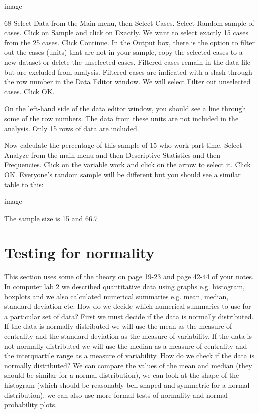 image
 
68%
Select Data from the Main menu, then Select Cases. Select Random sample of cases. Click on Sample and click on Exactly. We want to select exactly 15 cases from the 25 cases. Click Continue. In the Output box, there is the option to filter out the cases (units) that are not in your sample, copy the selected cases to a new dataset or delete the unselected cases. Filtered cases remain in the data file but are excluded from analysis. Filtered cases are indicated with a slash through the row number in the Data Editor window. We will select Filter out unselected cases. Click OK.

On the left-hand side of the data editor window, you should see a line through some of the row numbers. The data from these units are not included in the analysis. Only 15 rows of data are included.

Now calculate the percentage of this sample of 15 who work part-time. Select Analyze from the main menu and then Descriptive Statistics and then Frequencies. Click on the variable work and click on the arrow to select it. Click OK.
Everyone’s random sample will be different but you should see a similar table to this:

image
 
The sample size is 15 and 66.7%

\section{Testing for normality}
 
This section uses some of the theory on page 19-23 and page 42-44 of your notes. In computer lab 2 we described quantitative data using graphs e.g. histogram, boxplots and we also calculated numerical summaries e.g. mean, median, standard deviation etc. How do we decide which numerical summaries to use for a particular set of data? First we must decide if the data is normally distributed. If the data is normally distributed we will use the mean as the measure of centrality and the standard deviation as the measure of variability. If the data is not normally distributed we will use the median as a measure of centrality and the interquartile range as a measure of variability. How do we check if the data is normally distributed? We can compare the values of the mean and median (they should be similar for a normal distribution), we can look at the shape of the histogram (which should be reasonably bell-shaped and symmetric for a normal distribution), we can also use more formal tests of normality and normal probability plots.
 
